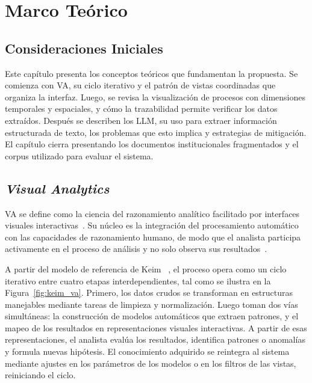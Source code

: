
\chapter{Marco Teórico}
\label{cap:marco_teorico}


\section{Consideraciones Iniciales}
Este capítulo presenta los conceptos teóricos que 
fundamentan la propuesta. Se comienza con \ac{VA}, 
su ciclo iterativo y el patrón de vistas coordinadas 
que organiza la interfaz. Luego, se revisa la 
visualización de procesos con dimensiones temporales 
y espaciales, y cómo la trazabilidad permite verificar 
los datos extraídos. Después se describen los 
\acs{LLM}, su uso para extraer información estructurada 
de texto, los problemas que esto implica y estrategias de mitigación. El capítulo 
cierra presentando los documentos institucionales 
fragmentados y el corpus 
utilizado para evaluar el sistema.

\section{\textit{Visual Analytics}}

\ac{VA} se define como la ciencia del razonamiento 
analítico facilitado por interfaces visuales 
interactivas~\cite{thomas2005illuminating}. Su núcleo 
es la integración del procesamiento automático con las 
capacidades de razonamiento humano, de modo que el 
analista participa activamente en el proceso de 
análisis y no solo observa sus resultados~\cite{keim2008visual, 
cui2019visual}.

A partir del modelo de referencia de Keim ~\cite{keim2008visual}, el proceso opera como un 
ciclo iterativo entre cuatro etapas interdependientes, 
tal como se ilustra en la Figura~\ref{fig:keim_va}. 
Primero, los datos crudos se transforman en estructuras 
manejables mediante tareas de limpieza y normalización. 
Luego toman dos vías simultáneas: la construcción de 
modelos automáticos que extraen patrones, y el mapeo de 
los resultados en representaciones visuales interactivas. 
A partir de esas representaciones, el analista evalúa 
los resultados, identifica patrones o anomalías y formula 
nuevas hipótesis. El 
conocimiento adquirido se reintegra al sistema mediante 
ajustes en los parámetros de los modelos o en los filtros 
de las vistas, reiniciando el ciclo.

